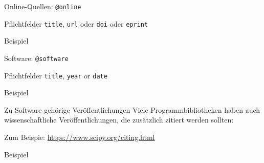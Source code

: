 \begin{frame}[fragile]{Online-Quellen: \lstinline+@online+}
  \begin{block}{Pflichtfelder}
    \texttt{title},
    \texttt{url} oder \texttt{doi} oder \texttt{eprint}
  \end{block}

  \begin{block}{Beispiel}
    
  \end{block}
\end{frame}

\begin{frame}[fragile]{Software: \lstinline+@software+}
  \begin{block}{Pflichtfelder}
    \texttt{title},
    \texttt{year} or \texttt{date}
  \end{block}

  \begin{block}{Beispiel}
    
  \end{block}
\end{frame}

\begin{frame}[fragile]{Zu Software gehörige Veröffentlichungen}
    Viele Programmbibliotheken haben auch wissenschaftliche Veröffentlichungen,
    die zusätzlich zitiert werden sollten:

    Zum Beispie: \url{https://www.scipy.org/citing.html}

    \begin{block}{Beispiel}
      \footnotesize
      
    \end{block}

\end{frame}

